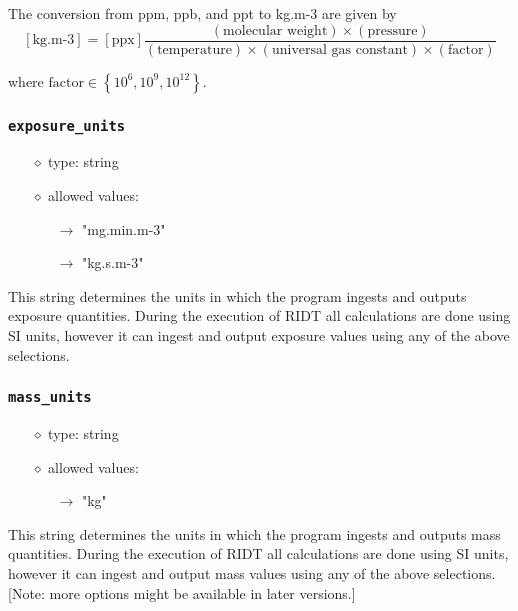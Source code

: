 \documentclass[]{article}
\def\code#1{\texttt{#1}}
\begin{document}
\noindent The conversion from ppm, ppb, and ppt to kg.m-3 are given by
\begin{equation}
    \left[\text{kg.m-3}\right] = \left[\text{ppx}\right]\frac{\left(\text{molecular weight}\right)
    \times \left(\text{pressure}\right)}{\left(\text{temperature}\right) \times \left(\text{universal gas constant}\right) \times \left(\text{factor}\right)}
\end{equation}

\noindent where $\text{factor} \in \left\{10^{6}, 10^{9}, 10^{12}\right\}$.

\subsubsection{\code{exposure\_units}}\label{sec:exposureunits}
\begin{itemize}
    \item[$\diamond$] type: string 
    \item[$\diamond$] allowed values:
    \begin{itemize}
        \item[$\rightarrow$] "mg.min.m-3"
        \item[$\rightarrow$] "kg.s.m-3"
    \end{itemize}
\end{itemize}
This string determines the units in which the program ingests and outputs
exposure quantities. During the execution of RIDT all calculations are done
using SI units, however it can ingest and output exposure values using any
of the above selections.

\subsubsection{\code{mass\_units}}\label{sec:massunits}
\begin{itemize}
    \item[$\diamond$] type: string 
    \item[$\diamond$] allowed values:
    \begin{itemize}
        \item[$\rightarrow$] "kg"
    \end{itemize}
\end{itemize}
This string determines the units in which the program ingests and outputs mass
quantities. During the execution of RIDT all calculations are done using SI
units, however it can ingest and output mass values using any of the above
selections. [Note: more options might be available in later versions.]
\end{document}

